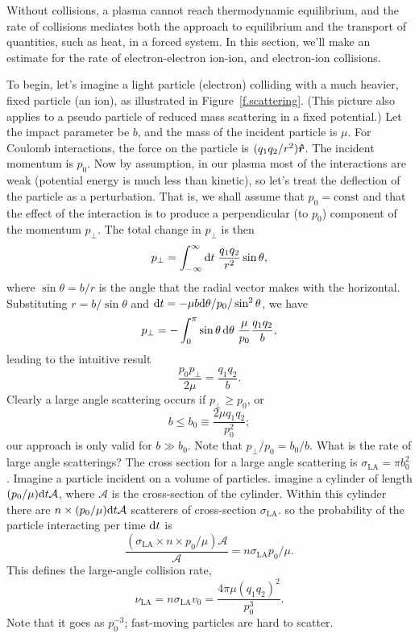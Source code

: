 Without collisions, a plasma cannot reach thermodynamic equilibrium, and the rate of collisions mediates both the approach to equilibrium and the transport of quantities, such as heat, in a forced system. In this section, we'll make an estimate for the rate of electron-electron ion-ion, and electron-ion collisions.

To begin, let's imagine a light particle (electron) colliding with a much heavier, fixed particle (an ion), as illustrated in Figure~\ref{f.scattering}.  (This picture also applies to a pseudo particle of reduced mass scattering in a fixed potential.)  Let the impact parameter be $b$, and the mass of the incident particle is $\mu$.  For Coulomb interactions, the force on the particle is $(q_{1}q_{2}/r^{2})\boldsymbol{\hat{r}}$. The incident momentum is $p_{0}$. Now by assumption, in our plasma most of the interactions are weak (potential energy is much less than kinetic), so let's treat the deflection of the particle as a perturbation.  That is, we shall assume that $p_{0} = \textrm{const}$ and that the effect of the interaction is to produce a perpendicular (to $p_{0}$) component of the momentum $p_{\bot}$.  The total change in $p_{\bot}$ is then
\[ p_{\bot} = \int_{-\infty}^{\infty}\mathrm{d} t\; \frac{q_{1}q_{2}}{r^{2}}\sin\theta, \]
where $\sin\theta = b/r$ is the angle that the radial vector makes with the horizontal.  Substituting $r = b/\sin\theta$ and $\mathrm{d} t = -\mu b \mathrm{d} \theta/p_{0}/\sin^{2}\theta$, we have
\[ p_{\bot} = -\int_{0}^{\pi} \sin\theta\,\mathrm{d}\theta\; \frac{\mu}{p_{0}}\frac{q_{1}q_{2}}{b}, \]
leading to the intuitive result
\begin{equation}\label{e.pperp}
\frac{p_{0}p_{\bot}}{2\mu} = \frac{q_{1}q_{2}}{b}.
\end{equation}
Clearly a large angle scattering occurs if $p_{\bot}\ge p_{0}$, or
\begin{equation}\label{e.b0}
b \le b_{0} \equiv \frac{2\mu q_{1}q_{2}}{p_{0}^{2}};
\end{equation}
our approach is only valid for $b \gg b_{0}$.  Note that $p_{\bot}/p_{0} = b_{0}/b$. What is the rate of large angle  scatterings? The cross section for a large angle scattering is
$ \sigma_{\mathrm{LA}} = \pi b_{0}^{2}$.  Imagine a particle incident on a volume of particles.  imagine a cylinder of length $(p_{0}/\mu)\mathrm{d} t \mathcal{A}$, where $\mathcal{A}$ is the cross-section of the cylinder.  Within this cylinder there are $n\times (p_{0}/\mu)\mathrm{d} t \mathcal{A}$ scatterers of cross-section $\sigma_{\mathrm{LA}}$. so the probability of the particle interacting per time $\mathrm{d} t$ is
\[ \frac{(\sigma_{\mathrm{LA}}\times n\times p_{0}/\mu) \mathcal{A}}{\mathcal{A}}  = n\sigma_{\mathrm{LA}} p_{0}/\mu. \]
This defines the large-angle collision rate,
\begin{equation}\label{e.large-angle-collision-rate}
\nu_{\mathrm{LA}} = n\sigma_{\mathrm{LA}} v_{0} = \frac{4\pi \mu (q_{1}q_{2})^{2}}{p_{0}^{3}}.
\end{equation}
Note that it goes as $p_{0}^{-3}$; fast-moving particles are hard to scatter.

